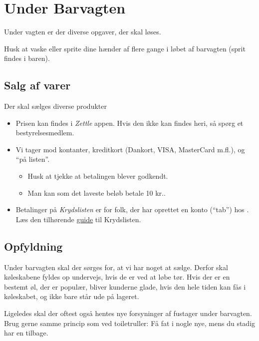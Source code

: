 \section{Under Barvagten}
\label{sec:intra-barvagten}

Under vagten er der diverse opgaver, der skal løses.

Husk at vaske eller sprite dine hænder af flere gange i løbet af barvagten 
(sprit findes i baren).

\subsection{Salg af varer}
\label{sec:intra:salg}

Der skal sælges diverse produkter
\begin{itemize}
    \item Prisen kan findes i \textit{Zettle} appen. Hvis den ikke kan findes heri, så spørg et bestyrelsesmedlem.
    \item Vi tager mod kontanter, kreditkort (Dankort, VISA, MasterCard
    m.fl.), og ``på listen''.
    \begin{itemize}
        \item Husk at tjekke at betalingen blever godkendt.
        \item Man kan som det laveste beløb betale 10 kr..
    \end{itemize}
    \item Betalinger på \textit{Krydslisten} er for folk, der har oprettet en konto
    (``tab'') hos \fredagscafeen. Læs den tilhørende \href{https://media.fredagscafeen.dk/guides/krydsliste.pdf}{guide} til Krydslisten.
\end{itemize}

\subsection{Opfyldning}
\label{sec:intra:opfyldning}

Under barvagten skal der sørges for, at vi har noget at sælge. Derfor skal
køleskabene fyldes op undervejs, hvis de er ved at løbe tør. Hvis der
er en bestemt øl, der er populær, bliver kunderne glade, hvis den hele
tiden kan fås i køleskabet, og ikke bare står ude på lageret.

Ligeledes skal der oftest også hentes nye forsyninger af fustager
under barvagten. Brug gerne samme princip som ved toiletruller: Få fat
i nogle nye, mens du stadig har en tilbage.

